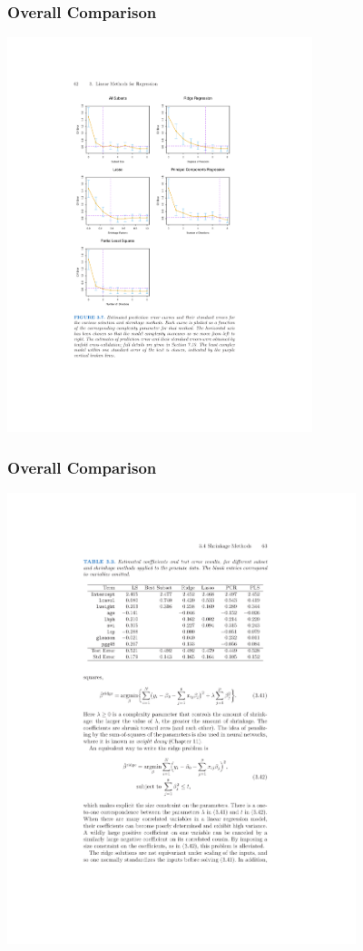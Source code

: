\documentclass[xcolor=pdftex,dvipsnames,table,mathserif,aspectratio=169]{beamer}
\begin{document}
\begin{frame}
\frametitle{Overall Comparison}
\begin{center}
\includegraphics[width=3.5in]{./resources/comparisons}
\end{center}
\end{frame}

\begin{frame}
\frametitle{Overall Comparison}
\begin{center}
\includegraphics[width=4in]{./resources/regressiontable}
\end{center}
\end{frame}
\end{document}
